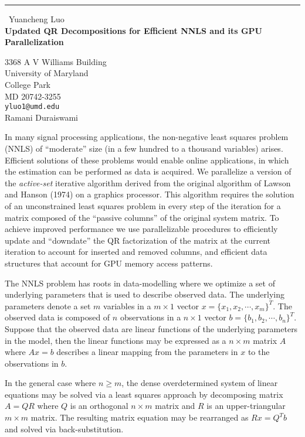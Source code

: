 \documentclass{report}
\begin{document}
\begin{center}
\rule{6in}{1pt} \
{\large Yuancheng Luo \\
{\bf Updated QR Decompositions for Efficient NNLS and its GPU Parallelization}}

3368 A V Williams Building \\ University of Maryland \\ College Park \\ MD 20742-3255
\\
{\tt yluo1@umd.edu}\\
Ramani Duraiswami\end{center}

\newcommand{\field}[1]{\mathbb{#1}}
\def\norm#1{\|#1\|}
In many signal processing applications, the non-negative least squares
problem (NNLS) of ``moderate'' size (in a few hundred to a thousand
variables) arises. Efficient solutions of these problems would enable
online applications, in which the estimation can be performed as data is
acquired. We parallelize a version of the {\em active-set} iterative
algorithm derived from the original algorithm of Lawson and Hanson (1974)
on a graphics processor. This algorithm requires the solution of an
unconstrained least squares problem in every step of the iteration for a
matrix composed of the ``passive columns'' of the original system matrix.
To achieve improved performance we use parallelizable procedures to
efficiently update and ``downdate'' the QR factorization of the matrix at
the current iteration to account for inserted and removed columns, and
efficient data structures that account for GPU memory access patterns.

The NNLS problem has roots in data-modelling where we optimize a set of
underlying parameters that is used to describe observed data. The
underlying parameters denote a set $m$ variables in a $m\times{1}$ vector
$x=\{x_1,x_2,\cdots,x_m\}^T$. The observed data is composed of $n$
observations in a $n\times{1}$ vector $b=\{b_1,b_2,\cdots,b_n\}^T$.
Suppose that the observed data are linear functions of the underlying
parameters in the model, then the linear functions may be expressed as a
$n\times{m}$ matrix $A$ where $Ax=b$ describes a linear mapping from the
parameters in $x$ to the observations in $b$.

In the general case where $n\geq{m}$, the dense overdetermined system of
linear equations may be solved via a least squares approach by
decomposing matrix $A=QR$ where $Q$ is an orthogonal $n\times{m}$ matrix
and $R$ is an upper-triangular $m\times{m}$ matrix. The resulting matrix
equation may be rearranged as $Rx=Q^Tb$ and solved via back-substitution.
\end{document}
